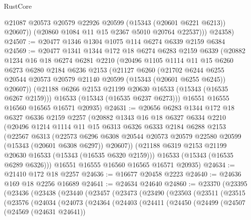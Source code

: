 \begin{lexlean}{RustCore}
\begin{coremodule}
              @21087
              @20573
              @20579
              @22926
              @20599
              (@15343 (@20601 @6221 @6213))
              @20607))
          (@20860 @1084 @11 @15 @2367 @5010 @20764 @22537)))
      @24358)
@24507 := @20477 @1346 @1304 @1075 @114 @6274 @6339 @2159 @6384
@24569 := @20477
    @1341
    @1344
    @172
    @18
    @6274
    @6283
    @2159
    @6339
    (@20882
      @1234
      @16
      @18
      @6274
      @6281
      @2210
      (@20496
        @1105
        @1114
        @11
        @15
        @6260
        @6273
        @6280
        @2184
        @6236
        @2153
        (@21127
          @6260
          (@21702
            @6244
            @6255
            @20544
            @20573
            @20579
            @21140
            @20599
            (@15343 (@20601 @6255 @6245))
            @20607))
        (@21188 @6266 @2153 @21199 @20630 @16533 (@15343 (@16535 @6267 @2159)))
        @16533
        (@15343 (@16535 @6237 @6273)))
      @16551
      @16555
      @16560
      @16565
      @16571
      @20935)
@24631 := @20656
    @6283
    @1344
    @172
    @18
    @6327
    @6336
    @2159
    @2257
    (@20882
      @1343
      @16
      @18
      @6327
      @6334
      @2210
      (@20496
        @1214
        @1114
        @11
        @15
        @6313
        @6326
        @6333
        @2184
        @6288
        @2153
        (@22567
          @6313
          (@22573
            @6296
            @6308
            @20544
            @20573
            @20579
            @22580
            @20599
            (@15343 (@20601 @6308 @6297))
            @20607))
        (@21188 @6319 @2153 @21199 @20630 @16533 (@15343 (@16535 @6320 @2159)))
        @16533
        (@15343 (@16535 @6289 @6326)))
      @16551
      @16555
      @16560
      @16565
      @16571
      @20935)
@24634 := @21410 @172 @18 @2257
@24636 := @16677 @20458 @2223
@24640 := @24636 @169 @18 @2256 @16689
@24641 := @24634 @24640
@24860 := @23370
    (@23395
      (@23436
        (@23438
          (@23440
            (@23457
              (@23473
                (@23490
                  (@23503
                    (@23511
                      (@23515
                        (@23576
                          (@24034
                            (@24073
                              (@24364
                                (@24403
                                  (@24411
                                    (@24450
                                      (@24499
                                        (@24507
                                          (@24569 (@24631 @24641))

\end{coremodule}
\end{lexlean}
